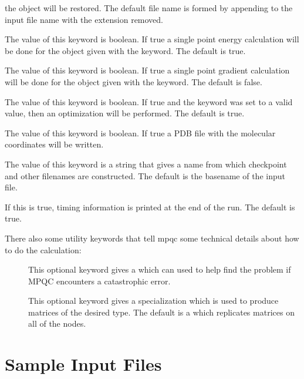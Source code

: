 \begin{description}
        the  object will be restored.  The default file name
        is formed by appending  to the input file name
        with the extension removed.
\item[\keywd{do\_energy}] The value of this keyword is boolean.  If
        true a single point energy calculation will be done for the
         object given with the 
        keyword.  The default is true.
\item[\keywd{do\_gradient}] The value of this keyword is boolean.  If
        true a single point gradient calculation will be done for the
         object given with the 
        keyword.  The default is false.
\item[\keywd{optimize}] The value of this keyword is boolean.  If
        true and the  keyword was set to a valid value,
        then an optimization will be performed.  The default is true.
\item[\keywd{write\_pdb}] The value of this keyword is boolean.  If
        true a PDB file with the molecular coordinates will be written.
\item[\keywd{filename}] The value of this keyword is a string that
        gives a name from which checkpoint and other filenames are
        constructed.  The default is the basename of the input file.
\item[\keywd{print\_timings}] If this is true, timing information
        is printed at the end of the run.  The default is true.
\end{description}

There also some utility keywords that tell mpqc some technical
details about how to do the calculation:
\begin{description}
\item[] This optional keyword gives a 
         which can used to help find the problem
        if MPQC encounters a catastrophic error.
\item[]
        This optional keyword gives a  specialization
        which is used to produce matrices of the desired type.
        The default is a  which replicates
        matrices on all of the nodes.
\end{description}



\section{Sample Input Files}

